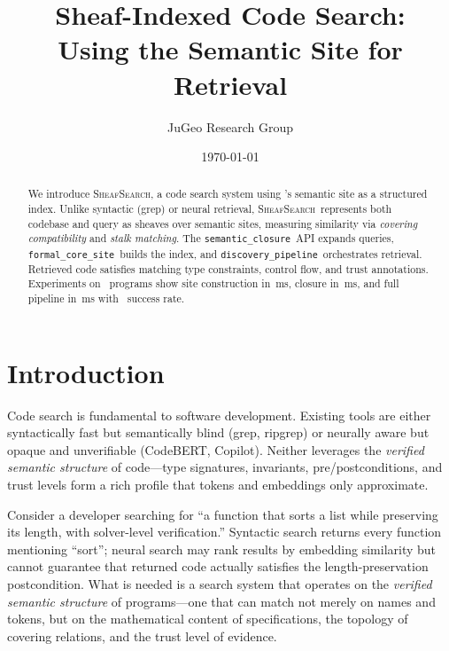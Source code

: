 \documentclass[11pt]{article}
\title{\textbf{Sheaf-Indexed Code Search:\\
Using the Semantic Site for Retrieval}}
\author{%
  JuGeo Research Group
}
\date{\today}
\newcommand{\SemanticClosure}{\texttt{semantic\_closure}}
\newcommand{\FormalCoreSite}{\texttt{formal\_core\_site}}
\newcommand{\DiscoveryPipeline}{\texttt{discovery\_pipeline}}
\newcommand{\CodeSearch}{\textsc{SheafSearch}}
\begin{document}
\maketitle

\begin{abstract}
We introduce \CodeSearch, a code search system using \JuGeo's semantic
site as a structured index.  Unlike syntactic (grep) or neural
retrieval, \CodeSearch\ represents both codebase and query as sheaves
over semantic sites, measuring similarity via \emph{covering
compatibility} and \emph{stalk matching}.  The \SemanticClosure\ API
expands queries, \FormalCoreSite\ builds the index, and
\DiscoveryPipeline\ orchestrates retrieval.  Retrieved code satisfies
matching type constraints, control flow, and trust annotations.
Experiments on \compTotalPrograms\ programs show site construction in
\compSiteMeanBuildMs\,ms, closure in
\compProfSemanticClosureMeanMs\,ms, and full pipeline in
\compProfDiscoveryPipelineMeanMs\,ms with
\compProfDiscoveryPipelineRate\ success rate.
\end{abstract}

\newpage

\section{Introduction}\label{sec:intro}

Code search is fundamental to software development.  Existing tools are
either syntactically fast but semantically blind (grep, ripgrep) or
neurally aware but opaque and unverifiable (CodeBERT, Copilot).  Neither
leverages the \emph{verified semantic structure} of code---type
signatures, invariants, pre/postconditions, and trust levels form a rich
profile that tokens and embeddings only approximate.

Consider a developer searching for ``a function that sorts a list while
preserving its length, with solver-level verification.''  Syntactic
search returns every function mentioning ``sort''; neural search may rank
results by embedding similarity but cannot guarantee that returned code
actually satisfies the length-preservation postcondition.  What is
needed is a search system that operates on the \emph{verified semantic
structure} of programs---one that can match not merely on names and
tokens, but on the mathematical content of specifications, the topology
of covering relations, and the trust level of evidence.
\end{document}
